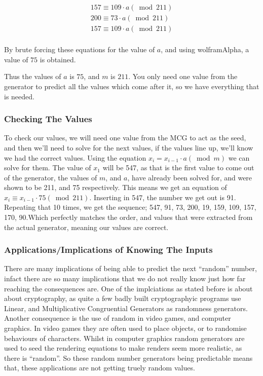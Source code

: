 \documentclass[12pft, english]{article}
\begin{document}
\begin{multicols}{2}
  \begin{gather*}
      157 \equiv 109 \cdot a (\bmod 211) \\
      200 \equiv 73 \cdot a (\bmod 211)  \\
      157 \equiv 109 \cdot a (\bmod 211) \\
    \end{gather*}

    By brute forcing these equations for the value of \(a\), and using wolframAlpha, a value of \(75\) is obtained.

    Thus the values of \(a\) is \(75\), and \(m\) is \(211\). You only need one value from the generator to predict all the values which come after it, so we have everything that is needed.

    \subsubsection{Checking The Values}
    To check our values, we will need one value from the MCG to act as the seed, and then we'll need to solve for the next values, if the values line up, we'll know we had the correct values. Using the equation \(x_{i} = x_{i-1} \cdot a (\bmod m)\) we can solve for them. The value of \(x_{1}\) will be 547, as that is the first value to come out of the generator, the values of \(m\), and \(a\), have already been solved for, and were shown to be 211, and 75 respectively. This means we get an equation of \( x_{i} \equiv x_{i-1} \cdot 75 (\bmod 211)\). Inserting in 547, the number we get out is 91. Repeating that 10 times, we get the sequence; 547, 91, 73, 200, 19, 159, 109, 157, 170, 90.Which perfectly matches the order, and values that were extracted from the actual generator, meaning our values are correct.

    \subsubsection{Applications/Implications of Knowing The Inputs}
    There are many implications of being able to predict the next ``random'' number, infact there are so many implications that we do not really know just how far reaching the consequences are. One of the implciations as stated before is about about cryptography, as quite a few badly built cryptographyic programs use Linear, and Multiplicative Congruential Generators as randomness generators. Another consequence is the use of random in video games, and computer graphics. In video games they are often used to place objects, or to randomise behaviours of characters. Whilst in computer graphics random generators are used to seed the rendering equations to make renders seem more realistic, as there is ``random''. So these random number generators being predictable means that, these applications are not getting truely random values.

\end{multicols}






\end{document}
